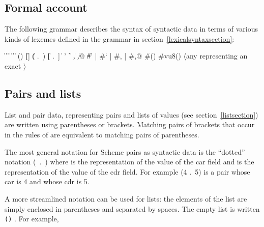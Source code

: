 \subsection{Formal account}
\label{datumsyntax}

The following grammar describes the syntax of syntactic data in terms
of various kinds of lexemes defined in the grammar in
section~\ref{lexicalsyntaxsection}:

\begin{grammar}%
 \: 
\>  \| 
 \:  \| 
\>  \|  \|  \|  
 \: 
 \:  \|  \| 
 \: () \| []
\>    \| ( .\ ) \| [ .\ ]
\>    \| 
 \:  
 \: ' \| ` \| , \| ,@ \| \#' | \#` | \#, | \#,@
 \: \#()
 \: \#vu8()
 \: $\langle${\rm any  representing an exact}
 \>\>\quad{}$\rangle$%
\end{grammar}

\subsection{Pairs and lists}
\label{pairlistsyntax}

List and pair data, representing pairs and lists of values
(see section~\ref{listsection}) are written using parentheses or brackets.
Matching pairs of brackets that occur in the rules of  are
equivalent to matching pairs of parentheses.

The most general notation for Scheme pairs as syntactic data is
the ``dotted'' notation \hbox{\cf ( .\ )} where
 is the representation of the value of the car field and
 is the representation of the value of the
cdr field.  For example {\cf (4 .\ 5)} is a pair whose car is 4 and whose
cdr is 5.

A more streamlined notation can be used for lists: the elements of the
list are simply enclosed in parentheses and separated by spaces.  The
empty list is written {\tt()} .  For example,

